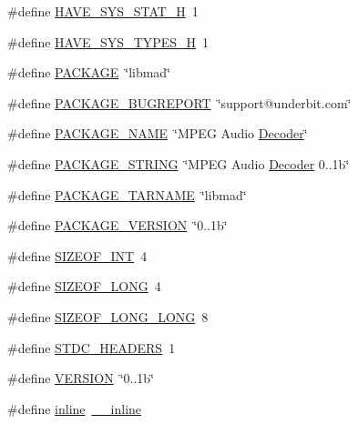 \begin{DoxyCompactItemize}
\item 
\#define \hyperlink{lib-src_2libmad_2msvc_09_09_2config_8h_ace156430ba007d19b4348a950d0c692b}{H\+A\+V\+E\+\_\+\+S\+Y\+S\+\_\+\+S\+T\+A\+T\+\_\+H}~1
\item 
\#define \hyperlink{lib-src_2libmad_2msvc_09_09_2config_8h_a69dc70bea5d1f8bd2be9740e974fa666}{H\+A\+V\+E\+\_\+\+S\+Y\+S\+\_\+\+T\+Y\+P\+E\+S\+\_\+H}~1
\item 
\#define \hyperlink{lib-src_2libmad_2msvc_09_09_2config_8h_aca8570fb706c81df371b7f9bc454ae03}{P\+A\+C\+K\+A\+GE}~\char`\"{}libmad\char`\"{}
\item 
\#define \hyperlink{lib-src_2libmad_2msvc_09_09_2config_8h_a1d1d2d7f8d2f95b376954d649ab03233}{P\+A\+C\+K\+A\+G\+E\+\_\+\+B\+U\+G\+R\+E\+P\+O\+RT}~\char`\"{}support@underbit.\+com\char`\"{}
\item 
\#define \hyperlink{lib-src_2libmad_2msvc_09_09_2config_8h_a1c0439e4355794c09b64274849eb0279}{P\+A\+C\+K\+A\+G\+E\+\_\+\+N\+A\+ME}~\char`\"{}M\+P\+EG Audio \hyperlink{class_decoder}{Decoder}\char`\"{}
\item 
\#define \hyperlink{lib-src_2libmad_2msvc_09_09_2config_8h_ac73e6f903c16eca7710f92e36e1c6fbf}{P\+A\+C\+K\+A\+G\+E\+\_\+\+S\+T\+R\+I\+NG}~\char`\"{}M\+P\+EG Audio \hyperlink{class_decoder}{Decoder} 0..\+1b\char`\"{}
\item 
\#define \hyperlink{lib-src_2libmad_2msvc_09_09_2config_8h_af415af6bfede0e8d5453708afe68651c}{P\+A\+C\+K\+A\+G\+E\+\_\+\+T\+A\+R\+N\+A\+ME}~\char`\"{}libmad\char`\"{}
\item 
\#define \hyperlink{lib-src_2libmad_2msvc_09_09_2config_8h_aa326a05d5e30f9e9a4bb0b4469d5d0c0}{P\+A\+C\+K\+A\+G\+E\+\_\+\+V\+E\+R\+S\+I\+ON}~\char`\"{}0..\+1b\char`\"{}
\item 
\#define \hyperlink{lib-src_2libmad_2msvc_09_09_2config_8h_a44184cf844a916eee78598ab35fc966b}{S\+I\+Z\+E\+O\+F\+\_\+\+I\+NT}~4
\item 
\#define \hyperlink{lib-src_2libmad_2msvc_09_09_2config_8h_a22aece5d034fd9040a3d01c3797fdfe7}{S\+I\+Z\+E\+O\+F\+\_\+\+L\+O\+NG}~4
\item 
\#define \hyperlink{lib-src_2libmad_2msvc_09_09_2config_8h_acd1ddb89a6f7f17d1c152499173c3eef}{S\+I\+Z\+E\+O\+F\+\_\+\+L\+O\+N\+G\+\_\+\+L\+O\+NG}~8
\item 
\#define \hyperlink{lib-src_2libmad_2msvc_09_09_2config_8h_a550e5c272cc3cf3814651721167dcd23}{S\+T\+D\+C\+\_\+\+H\+E\+A\+D\+E\+RS}~1
\item 
\#define \hyperlink{lib-src_2libmad_2msvc_09_09_2config_8h_a1c6d5de492ac61ad29aec7aa9a436bbf}{V\+E\+R\+S\+I\+ON}~\char`\"{}0..\+1b\char`\"{}
\item 
\#define \hyperlink{lib-src_2libmad_2msvc_09_09_2config_8h_a00d24c7231be28dbaf71f5408f30e44c}{inline}~\hyperlink{cdefs_8h_a96deb7ba5a74848afb710cc4ee6d2c08}{\+\_\+\+\_\+inline}
\end{DoxyCompactItemize}



